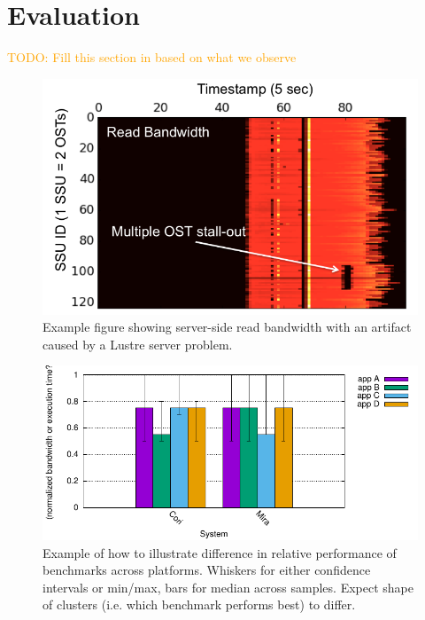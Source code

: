 \documentclass[conference,10pt,compsocconf]{IEEEtran}
\newcommand{\todo}[1]{\textcolor{Orange}{TODO: #1}}
\begin{document}
\section{Evaluation}

\todo{Fill this section in based on what we observe}

\begin{figure}[t]
\centering
\includegraphics[width=0.8\columnwidth]{figs/example.png}
\caption{Example figure showing server-side read bandwidth with an artifact
caused by a Lustre server problem.}
\label{fig:example}
\vspace{-.1in}
\end{figure}

\begin{figure}[t]
\centering
\includegraphics[width=0.8\columnwidth]{figs/example-bar-var.pdf}
\caption{Example of how to illustrate difference in relative performance of
benchmarks across platforms.  Whiskers for either confidence intervals or
min/max, bars for median across samples.  Expect shape of clusters (i.e.
which benchmark performs best) to differ.}
\label{fig:example-bar-var}
\vspace{-.1in}
\end{figure}
\end{document}
